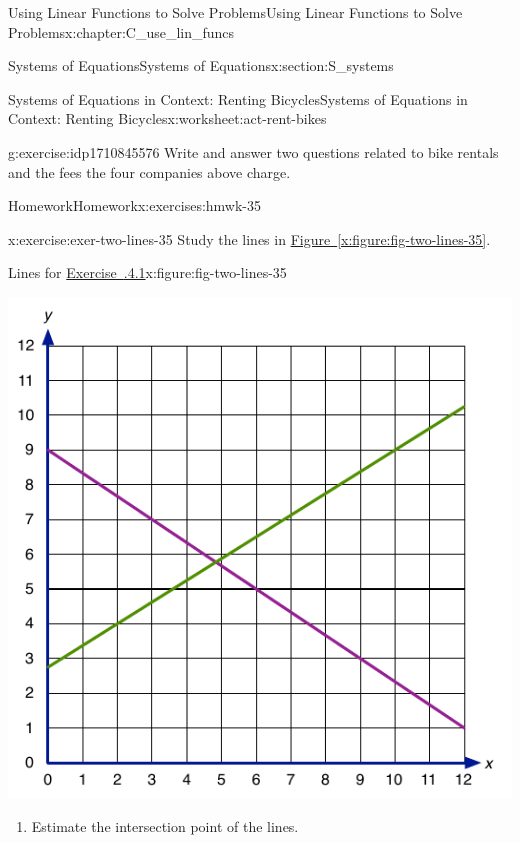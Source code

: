 \documentclass[oneside,10pt,]{book}
\newcommand{\xreffont}{\relax}
\numberwithin{equation}{chapter}
\begin{document}
\begin{chapterptx}{Using Linear Functions to Solve Problems}{}{Using Linear Functions to Solve Problems}{}{}{x:chapter:C_use_lin_funcs}
\begin{sectionptx}{Systems of Equations}{}{Systems of Equations}{}{}{x:section:S_systems}
\begin{worksheet-subsection}{Systems of Equations in Context: Renting Bicycles}{}{Systems of Equations in Context: Renting Bicycles}{}{}{x:worksheet:act-rent-bikes}
\begin{divisionexercise}{6}{}{}{g:exercise:idp1710845576}
Write and answer two questions related to bike rentals and the fees the four companies above charge.%
\end{divisionexercise}%
\end{worksheet-subsection}
\restoregeometry
%
%
\typeout{************************************************}
\typeout{************************************************}
%
\begin{exercises-subsection}{Homework}{}{Homework}{}{}{x:exercises:hmwk-35}
\begin{divisionexercise}{1}{}{}{x:exercise:exer-two-lines-35}%
Study the lines in \hyperref[x:figure:fig-two-lines-35]{Figure~{\xreffont\ref{x:figure:fig-two-lines-35}}}.%
\begin{figureptx}{Lines for \hyperlink{x:exercise:exer-two-lines-35}{Exercise~{\xreffont 3.5.4.1}}}{x:figure:fig-two-lines-35}{}%
\begin{image}{0.25}{0.5}{0.25}%
\includegraphics[width=\linewidth]{external/two-lines-35.pdf}
\end{image}%
\tcblower
\end{figureptx}%
\begin{enumerate}[font=\bfseries,label=(\alph*),ref=\alph*]
\item\label{x:task:exer-two-lines-intersect}Estimate the intersection point of the lines.%

\end{enumerate}
\end{divisionexercise}
\end{exercises-subsection}
\end{sectionptx}
\end{chapterptx}
\end{document}
